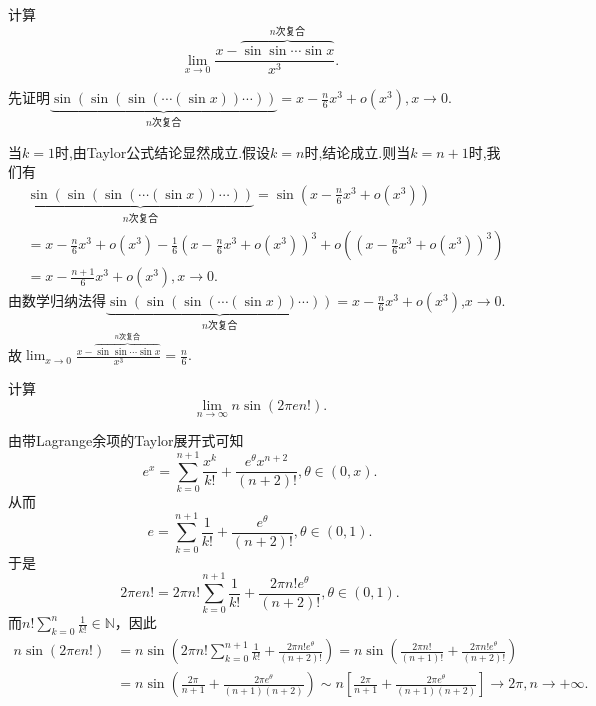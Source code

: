 \documentclass[../../main.tex]{subfiles}%
\begin{document}
\begin{example}
计算
\[
\lim_{x\rightarrow 0} \frac{x-\overset{n\text{次复合}}{\overbrace{\sin\sin \cdots \sin x}}}{x^3}.
\]
\end{example}
\begin{solution}
先证明\(\underbrace{\sin(\sin(\sin(\cdots (\sin x))\cdots))}_{n\text{次复合}} = x - \frac{n}{6}x^3 + o(x^3),x\to0\).

当\(k = 1\)时,由Taylor公式结论显然成立.假设\(k=n\)时,结论成立.则当\(k=n + 1\)时,我们有
\begin{align*}
&\underbrace{\sin(\sin(\sin(\cdots (\sin x))\cdots))}_{n\text{次复合}} = \sin\left(x - \frac{n}{6}x^3 + o(x^3)\right)
\\
&= x - \frac{n}{6}x^3 + o(x^3) - \frac{1}{6}\left(x - \frac{n}{6}x^3 + o(x^3)\right)^3 + o\left(\left(x - \frac{n}{6}x^3 + o(x^3)\right)^3\right)
\\
&= x - \frac{n + 1}{6}x^3 + o(x^3),x\to0.
\end{align*}
由数学归纳法得\(\underbrace{\sin(\sin(\sin(\cdots (\sin x))\cdots))}_{n\text{次复合}} = x - \frac{n}{6}x^3 + o(x^3)\),$x\to0$.
故$\lim_{x\rightarrow 0} \frac{x-\overset{n\text{次复合}}{\overbrace{\sin\sin \cdots \sin x}}}{x^3}=\frac{n}{6}.$

\end{solution}

\begin{example}
计算
\[
\lim_{n\rightarrow \infty}n\sin(2\pi en!).
\]
\end{example}
\begin{solution}
由带Lagrange余项的Taylor展开式可知
\[
e^x = \sum_{k = 0}^{n + 1}\frac{x^k}{k!} + \frac{e^{\theta}x^{n + 2}}{(n + 2)!}, \theta \in (0, x).
\]
从而
\[
e = \sum_{k = 0}^{n + 1}\frac{1}{k!} + \frac{e^{\theta}}{(n + 2)!}, \theta \in (0, 1).
\]
于是
\[
2\pi en! = 2\pi n!\sum_{k = 0}^{n + 1}\frac{1}{k!} + \frac{2\pi n!e^{\theta}}{(n + 2)!}, \theta \in (0, 1).
\]
而\(n!\sum_{k = 0}^n\frac{1}{k!} \in \mathbb{N}\)，因此
\begin{align*}
n\sin(2\pi en!)&=n\sin\left(2\pi n!\sum_{k = 0}^{n + 1}\frac{1}{k!} + \frac{2\pi n!e^{\theta}}{(n + 2)!}\right)
=n\sin\left(\frac{2\pi n!}{(n + 1)!} + \frac{2\pi n!e^{\theta}}{(n + 2)!}\right)\\
&=n\sin\left(\frac{2\pi}{n + 1} + \frac{2\pi e^{\theta}}{(n + 1)(n + 2)}\right)
\sim n\left[\frac{2\pi}{n + 1} + \frac{2\pi e^{\theta}}{(n + 1)(n + 2)}\right] \to 2\pi, n \to +\infty.
\end{align*} 

\end{solution}
\end{document}
